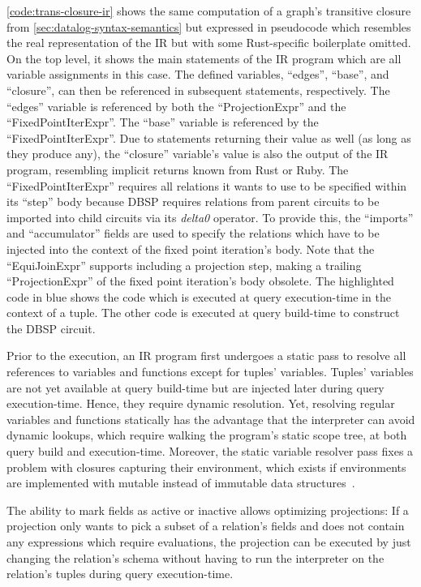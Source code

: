 \ref{code:trans-closure-ir} shows the same computation of a graph's transitive
closure from \ref{sec:datalog-syntax-semantics} but expressed in pseudocode which
resembles the real representation of the \ac{IR} but with some Rust-specific
boilerplate omitted.
On the top level, it shows the main statements of the \ac{IR} program which
are all variable assignments in this case.
The defined variables, ``edges'', ``base'', and ``closure'', can then be referenced
in subsequent statements, respectively.
The ``edges'' variable is referenced by both the ``ProjectionExpr'' and the
``FixedPointIterExpr''.
The ``base'' variable is referenced by the ``FixedPointIterExpr''.
Due to statements returning their value as well (as long as they produce any),
the ``closure'' variable's value is also the output of the \ac{IR} program,
resembling implicit returns known from Rust or Ruby.
The ``FixedPointIterExpr'' requires all relations it wants to use to be specified
within its ``step'' body because DBSP requires relations from parent circuits
to be imported into child circuits via its \emph{delta0} operator.
To provide this, the ``imports'' and ``accumulator'' fields are used to
specify the relations which have to be injected into the context of the fixed point
iteration's body.
Note that the ``EquiJoinExpr'' supports including a projection step,
making a trailing ``ProjectionExpr'' of the fixed point iteration's body obsolete.
The highlighted code in blue shows the code which is executed at query
execution-time in the context of a tuple.
The other code is executed at query build-time to construct the DBSP circuit.

Prior to the execution, an \ac{IR} program first undergoes a
static pass to resolve all references to variables and functions except for
tuples' variables.
Tuples' variables are not yet available at query build-time but are injected
later during query execution-time. Hence, they require dynamic resolution.
Yet, resolving regular variables and functions statically has the advantage that
the interpreter can avoid dynamic lookups, which require walking the program's
static scope tree, at both query build and execution-time.
Moreover, the static variable resolver pass fixes a problem with closures
capturing their environment, which exists if environments are implemented with
mutable instead of immutable data structures~\cite{nystrom2021crafting}.

The ability to mark fields as active or inactive allows optimizing projections:
If a projection only wants to pick a subset of a relation's fields and does not
contain any expressions which require evaluations, the projection can be executed
by just changing the relation's schema without having to run the interpreter
on the relation's tuples during query execution-time.

